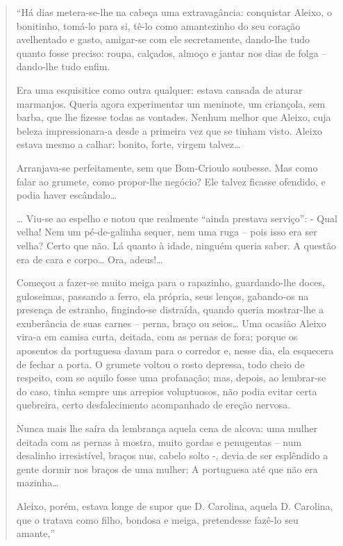 \documentclass[
  letterpaper,
  DIV=11,
  numbers=noendperiod]{scrreprt}
\begin{document}
\begin{quote}
``Há dias metera-se-lhe na cabeça uma extravagância: conquistar Aleixo,
o bonitinho, tomá-lo para si, tê-lo como amantezinho do seu coração
avelhentado e gasto, amigar-se com ele secretamente, dando-lhe tudo
quanto fosse preciso: roupa, calçados, almoço e jantar nos dias de folga
-- dando-lhe tudo enfim.

Era uma esquisitice como outra qualquer: estava cansada de aturar
marmanjos. Queria agora experimentar um meninote, um criançola, sem
barba, que lhe fizesse todas as vontades. Nenhum melhor que Aleixo, cuja
beleza impressionara-a desde a primeira vez que se tinham visto. Aleixo
estava mesmo a calhar: bonito, forte, virgem talvez\ldots{}

Arranjava-se perfeitamente, sem que Bom-Crioulo soubesse. Mas como falar
ao grumete, como propor-lhe negócio? Ele talvez ficasse ofendido, e
podia haver escândalo\ldots{}

\ldots{} Viu-se ao espelho e notou que realmente ``ainda prestava
serviço'': - Qual velha! Nem um pé-de-galinha sequer, nem uma ruga --
pois isso era ser velha? Certo que não. Lá quanto à idade, ninguém
queria saber. A questão era de cara e corpo\ldots{} Ora, adeus!\ldots{}

Começou a fazer-se muito meiga para o rapazinho, guardando-lhe doces,
guloseimas, passando a ferro, ela própria, seus lenços, gabando-os na
presença de estranho, fingindo-se distraída, quando queria mostrar-lhe a
exuberância de suas carnes -- perna, braço ou seios\ldots{} Uma ocasião
Aleixo vira-a em camisa curta, deitada, com as pernas de fora; porque os
aposentos da portuguesa davam para o corredor e, nesse dia, ela
esquecera de fechar a porta. O grumete voltou o rosto depressa, todo
cheio de respeito, com se aquilo fosse uma profanação; mas, depois, ao
lembrar-se do caso, tinha sempre uns arrepios voluptuosos, não podia
evitar certa quebreira, certo desfalecimento acompanhado de ereção
nervosa.

Nunca mais lhe saíra da lembrança aquela cena de alcova: uma mulher
deitada com as pernas à mostra, muito gordas e penugentas -- num
desalinho irresistível, braços nus, cabelo solto -, devia de ser
esplêndido a gente dormir nos braços de uma mulher: A portuguesa até que
não era mazinha\ldots{}

Aleixo, porém, estava longe de supor que D. Carolina, aquela D.
Carolina, que o tratava como filho, bondosa e meiga, pretendesse fazê-lo
seu amante,''
\end{quote}
\end{document}
